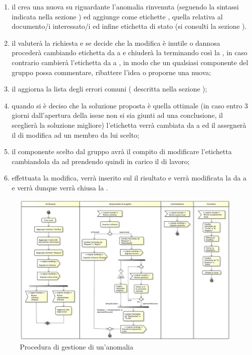 				\begin{enumerate}
				    \item il  crea una nuova  su  riguardante l'anomalia rinvenuta (seguendo la sintassi indicata nella sezione ) ed aggiunge come etichette , quella relativa al documento/i interessato/i ed infine etichetta di stato  (si consulti la sezione ).
				    \item il  valuterà la richiesta e se decide che la modifica è inutile o dannosa procederà cambiando etichetta da  a  e chiuderà la  terminando così la , in caso contrario cambierà l'etichetta da  a , in modo che un qualsiasi componente del gruppo possa commentare, ribattere l'idea o proporne una nuova;
				    \item il  aggiorna la lista degli errori comuni ( descritta nella sezione );
				    \item quando si è deciso che la soluzione proposta è quella ottimale (in caso entro 3 giorni dall'apertura della issue non si sia giunti ad una conclusione, il  sceglierà la soluzione migliore) l'etichetta verrà cambiata da  a  ed il  assegnerà il  di modifica ad un membro da lui scelto;
				    \item il componente scelto dal gruppo avrà il compito di modificare l'etichetta cambiandola da  ad  prendendo quindi in carico il  di lavoro;
				    \item effettuata la modifica, verrà inserito sul  il risultato e verrà modificata la  da  a  e verrà dunque verrà chiusa la .
			\end{enumerate}
			\begin{figure}[H]
					\centering
					\includegraphics[width=1.0\textwidth]{NormeDiProgetto/Pics/GestioneAnomalia}
					\caption{Procedura di gestione di un'anomalia}
				\end{figure}
